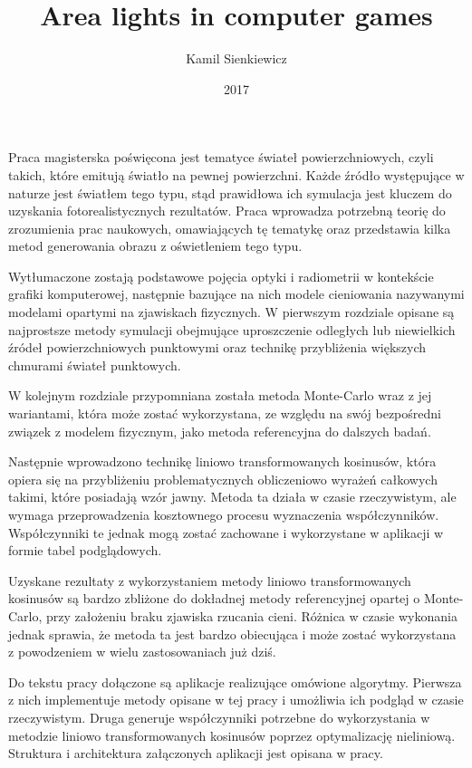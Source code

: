 \documentclass[pl]{minipw/minipw}
\title{Area lights in computer games}
\author{Kamil Sienkiewicz}
\date{2017}
\begin{document}
\sloppy
\setcounter{page}{1}

\begin{streszczenie}
Praca magisterska poświęcona jest tematyce świateł powierzchniowych, czyli takich, które emitują światło na pewnej powierzchni. Każde źródło występujące w naturze jest światłem tego typu, stąd prawidłowa ich symulacja jest kluczem do uzyskania fotorealistycznych rezultatów. Praca wprowadza potrzebną teorię do zrozumienia prac naukowych, omawiających tę tematykę oraz przedstawia kilka metod generowania obrazu z oświetleniem tego typu. 

Wytłumaczone zostają podstawowe pojęcia optyki i radiometrii w kontekście grafiki komputerowej, następnie bazujące na nich modele cieniowania nazywanymi modelami opartymi na zjawiskach fizycznych. W pierwszym rozdziale opisane są najprostsze metody symulacji obejmujące uproszczenie odległych lub niewielkich źródeł powierzchniowych punktowymi oraz technikę przybliżenia większych chmurami świateł punktowych. 

W kolejnym rozdziale przypomniana została metoda Monte-Carlo wraz z jej wariantami, która może zostać wykorzystana, ze względu na swój bezpośredni związek z modelem fizycznym, jako metoda referencyjna do dalszych badań. 

Następnie wprowadzono technikę liniowo transformowanych kosinusów, która opiera się na przybliżeniu problematycznych obliczeniowo wyrażeń całkowych takimi, które posiadają wzór jawny. Metoda ta działa w czasie rzeczywistym, ale wymaga przeprowadzenia kosztownego procesu wyznaczenia współczynników. Współczynniki te jednak mogą zostać zachowane i wykorzystane w aplikacji w formie tabel podglądowych. 

Uzyskane rezultaty z wykorzystaniem metody liniowo transformowanych kosinusów są bardzo zbliżone do dokładnej metody referencyjnej opartej o Monte-Carlo, przy założeniu braku zjawiska rzucania cieni. Różnica w czasie wykonania jednak sprawia, że metoda ta jest bardzo obiecująca i może zostać wykorzystana z powodzeniem w wielu zastosowaniach już dziś.

Do tekstu pracy dołączone są aplikacje realizujące omówione algorytmy. Pierwsza z nich implementuje metody opisane w tej pracy i umożliwia ich podgląd w czasie rzeczywistym. Druga generuje współczynniki potrzebne do wykorzystania w metodzie liniowo transformowanych kosinusów poprzez optymalizację nieliniową. Struktura i architektura załączonych aplikacji jest opisana w pracy.

\vspace{0.5cm}
\end{streszczenie}
\end{document}
